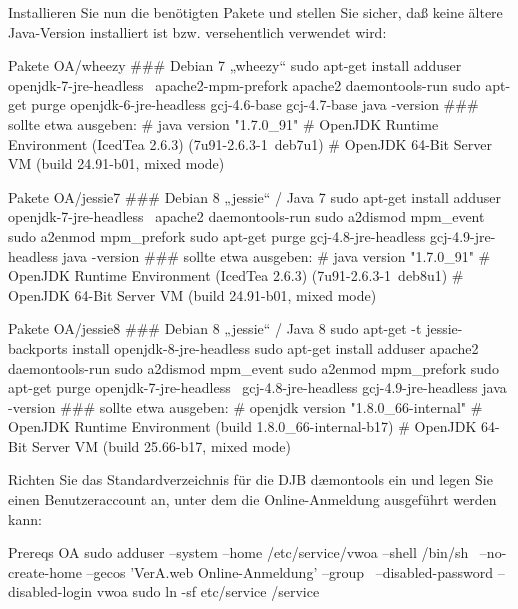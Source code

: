 \begin{minipage}{\textwidth}
Installieren Sie nun die benötigten Pakete und stellen Sie sicher, daß keine
ältere Java-Version installiert ist bzw. versehentlich verwendet wird:

\begin{lstdump}{Pakete OA/wheezy}
### Debian 7 „wheezy“
sudo apt-get install adduser openjdk-7-jre-headless \
    apache2-mpm-prefork apache2 daemontools-run
sudo apt-get purge openjdk-6-jre-headless gcj-4.6-base gcj-4.7-base
java -version
### sollte etwa ausgeben:
# java version "1.7.0_91"
# OpenJDK Runtime Environment (IcedTea 2.6.3) (7u91-2.6.3-1~deb7u1)
# OpenJDK 64-Bit Server VM (build 24.91-b01, mixed mode)
\end{lstdump}

\begin{lstdump}{Pakete OA/jessie7}
### Debian 8 „jessie“ / Java 7
sudo apt-get install adduser openjdk-7-jre-headless \
    apache2 daemontools-run
sudo a2dismod mpm_event
sudo a2enmod mpm_prefork
sudo apt-get purge gcj-4.8-jre-headless gcj-4.9-jre-headless
java -version
### sollte etwa ausgeben:
# java version "1.7.0_91"
# OpenJDK Runtime Environment (IcedTea 2.6.3) (7u91-2.6.3-1~deb8u1)
# OpenJDK 64-Bit Server VM (build 24.91-b01, mixed mode)
\end{lstdump}

\begin{lstdump}{Pakete OA/jessie8}
### Debian 8 „jessie“ / Java 8
sudo apt-get -t jessie-backports install openjdk-8-jre-headless
sudo apt-get install adduser apache2 daemontools-run
sudo a2dismod mpm_event
sudo a2enmod mpm_prefork
sudo apt-get purge openjdk-7-jre-headless \
    gcj-4.8-jre-headless gcj-4.9-jre-headless
java -version
### sollte etwa ausgeben:
# openjdk version "1.8.0_66-internal"
# OpenJDK Runtime Environment (build 1.8.0_66-internal-b17)
# OpenJDK 64-Bit Server VM (build 25.66-b17, mixed mode)
\end{lstdump}
\end{minipage}

\begin{minipage}{\textwidth}
Richten Sie das Standardverzeichnis für die DJB dæmontools
ein und legen Sie einen Benutzeraccount an, unter dem die
Online-Anmeldung ausgeführt werden kann:

\begin{lstdump}{Prereqs OA}
sudo adduser --system --home /etc/service/vwoa --shell /bin/sh \
    --no-create-home --gecos 'VerA.web Online-Anmeldung' --group \
    --disabled-password --disabled-login vwoa
sudo ln -sf etc/service /service
\end{lstdump}
\end{minipage}

